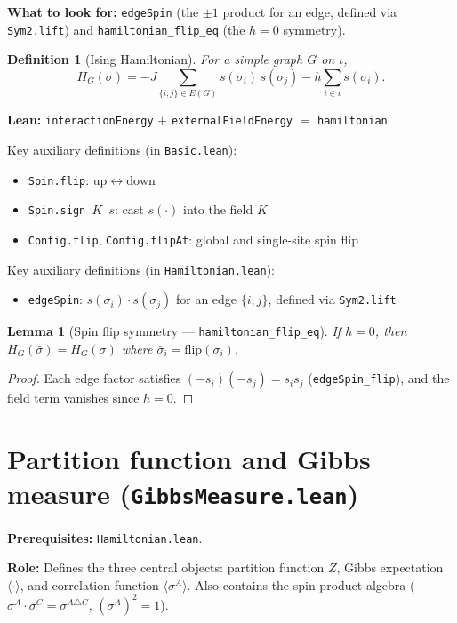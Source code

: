 \documentclass[a4paper,11pt]{article}
\newtheorem{lemma}[theorem]{Lemma}
\newtheorem{definition}[theorem]{Definition}
\begin{document}
\textbf{What to look for:} \texttt{edgeSpin} (the $\pm 1$ product
for an edge, defined via \texttt{Sym2.lift}) and
\texttt{hamiltonian\_flip\_eq} (the $h=0$ symmetry).

\begin{definition}[Ising Hamiltonian]
For a simple graph $G$ on $\iota$,
\[
  H_G(\sigma) = -J \sum_{\{i,j\} \in E(G)} s(\sigma_i)\,s(\sigma_j)
  - h \sum_{i \in \iota} s(\sigma_i).
\]
\end{definition}

\noindent\textbf{Lean:} \texttt{interactionEnergy} $+$
\texttt{externalFieldEnergy} $=$ \texttt{hamiltonian}

Key auxiliary definitions (in \texttt{Basic.lean}):
\begin{itemize}
  \item \texttt{Spin.flip}: $\mathrm{up} \leftrightarrow \mathrm{down}$
  \item \texttt{Spin.sign $K$ $s$}: cast $s(\cdot)$ into the field $K$
  \item \texttt{Config.flip}, \texttt{Config.flipAt}: global and single-site spin flip
\end{itemize}
Key auxiliary definitions (in \texttt{Hamiltonian.lean}):
\begin{itemize}
  \item \texttt{edgeSpin}: $s(\sigma_i) \cdot s(\sigma_j)$ for an edge
    $\{i,j\}$, defined via \texttt{Sym2.lift}
\end{itemize}

\begin{lemma}[Spin flip symmetry --- \texttt{hamiltonian\_flip\_eq}]
If $h = 0$, then $H_G(\bar{\sigma}) = H_G(\sigma)$ where
$\bar{\sigma}_i = \mathrm{flip}(\sigma_i)$.
\end{lemma}

\begin{proof}
Each edge factor satisfies $(-s_i)(-s_j) = s_i s_j$
(\texttt{edgeSpin\_flip}), and the field term vanishes since $h=0$.
\end{proof}

\section{Partition function and Gibbs measure (\texttt{GibbsMeasure.lean})}

\par\noindent\textbf{Prerequisites:} \texttt{Hamiltonian.lean}.

\textbf{Role:} Defines the three central objects: partition function $Z$,
Gibbs expectation $\langle\cdot\rangle$, and correlation function
$\langle\sigma^A\rangle$. Also contains the spin product algebra
($\sigma^A \cdot \sigma^C = \sigma^{A \triangle C}$, $(\sigma^A)^2 = 1$).
\end{document}
